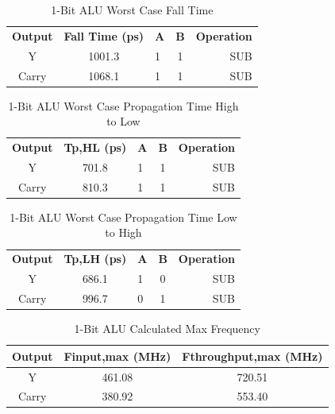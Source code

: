 \documentclass[11pt]{article}
\begin{document}
		
			\begin{table}[H]
				\centering
				\caption{1-Bit ALU Worst Case Fall Time}
				\label{tab:ALU-1-Bit-Falltime}
				\begin{tabular}{|cclcr|}
					\hline
					\textbf{Output} & \textbf{Fall Time (ps)} & \textbf{A} & \textbf{B} & \textbf{Operation} \\
					Y               & 1001.3                  & 1          & 1          & SUB                \\
					Carry           & 1068.1                  & 1          & 1          & SUB                \\
					\hline
				\end{tabular}
			\end{table}
		
		
			\begin{table}[H]
				\centering
				\caption{1-Bit ALU Worst Case Propagation Time High to Low}
				\label{tab:ALU-1-Bit-Tpd-HL}
				\begin{tabular}{|cclcr|}
					\hline
					\textbf{Output} & \textbf{Tp,HL (ps)} & \textbf{A} & \textbf{B} & \textbf{Operation} \\
					Y               & 701.8                   & 1          & 1          & SUB                \\
					Carry           & 810.3                   & 1          & 1          & SUB                \\
					\hline
				\end{tabular}
			\end{table}
		
			\begin{table}[H]
				\centering
				\caption{1-Bit ALU Worst Case Propagation Time Low to High}
				\label{tab:ALU-1-Bit-Tpd-LH}
				\begin{tabular}{|cclcr|}
					\hline
					\textbf{Output} & \textbf{Tp,LH (ps)} & \textbf{A} & \textbf{B} & \textbf{Operation} \\
					Y               & 686.1                   & 1          & 0          & SUB                \\
					Carry           & 996.7                   & 0          & 1          & SUB                \\
					\hline
				\end{tabular}
			\end{table}
		
			\begin{table}[H]
				\centering
				\caption{1-Bit ALU Calculated Max Frequency}
				\label{tab:ALU-1-Bit-Freq}
				\begin{tabular}{|ccc|}
					\hline
					\textbf{Output} & \textbf{Finput,max (MHz)} & \textbf{Fthroughput,max (MHz)} \\
					\hline
					Y               & 461.08                    & 720.51                         \\
					Carry           & 380.92                    & 553.40                         \\
					\hline
				\end{tabular}
			\end{table}
		
\end{document}
